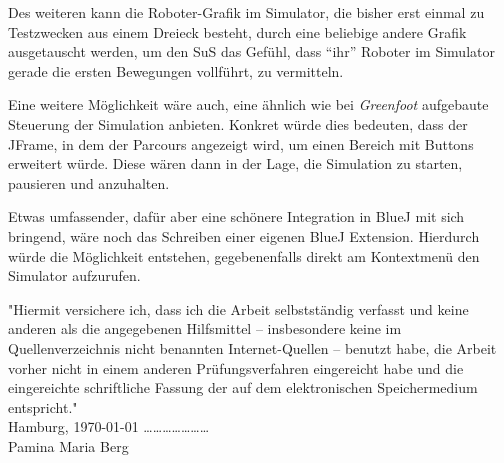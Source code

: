 \documentclass[paper=a4, pagesize, DIV=calc, BCOR=15.5mm, twoside=on, onecolumn=on, open = right, titlepage =on, parskip =half-, headsepline = on, footsepline = on, chapterprefix = on, appendixprefix = off, fontsize = 12pt, numbers = noenddot, abstract = on]{scrbook}
\numberwithin{equation}{chapter}
\theoremstyle{definition}
\theoremstyle{plain}
\theoremstyle{plain}
\theoremstyle{remark}
\theoremstyle{plain}
\theoremstyle{plain}
\begin{document}
Des weiteren kann die Roboter-Grafik im Simulator, die bisher erst einmal zu Testzwecken aus einem Dreieck besteht, durch eine beliebige andere Grafik ausgetauscht werden, um den SuS das Gefühl, dass "`ihr"' Roboter im Simulator gerade die ersten Bewegungen vollführt, zu vermitteln.

Eine weitere Möglichkeit wäre auch, eine ähnlich wie bei \emph{Greenfoot} aufgebaute Steuerung der Simulation anbieten. Konkret würde dies bedeuten, dass der JFrame, in dem der Parcours angezeigt wird, um einen Bereich mit Buttons erweitert würde. Diese wären dann in der Lage, die Simulation zu starten, pausieren und anzuhalten.

Etwas umfassender, dafür aber eine schönere Integration in BlueJ mit sich bringend, wäre noch das Schreiben einer eigenen BlueJ Extension. Hierdurch würde die Möglichkeit entstehen, gegebenenfalls direkt am Kontextmenü den Simulator aufzurufen.

\newpage

\newpage
\thispagestyle{empty}
\vspace*{\fill}
"Hiermit versichere ich, dass ich die Arbeit selbstständig verfasst und keine anderen als die angegebenen Hilfsmittel – insbesondere keine im Quellenverzeichnis nicht benannten Internet-Quellen – benutzt habe, die Arbeit vorher nicht in einem anderen Prüfungsverfahren eingereicht habe und die eingereichte schriftliche Fassung der auf dem elektronischen Speichermedium entspricht."\\

Hamburg, \today \hspace*{\fill} \dots \dots \dots \dots \dots \dots \dots\\
\hspace*{\fill} Pamina Maria Berg $\,$
\end{document}
